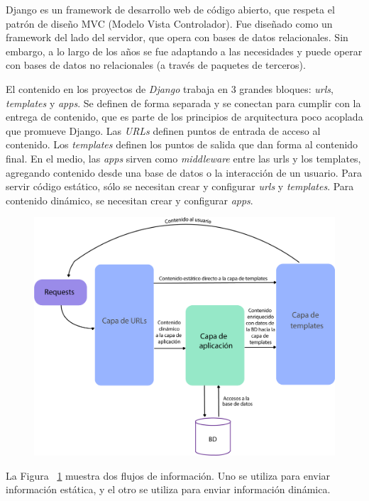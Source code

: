 Django es un framework de desarrollo web de código abierto, que respeta el patrón de diseño MVC (Modelo Vista Controlador). Fue diseñado como un framework del lado del servidor, que opera con bases de datos relacionales. Sin embargo, a lo largo de los años se fue adaptando a las necesidades y puede operar con bases de datos no relacionales (a través de paquetes de terceros).

El contenido en los proyectos de \textit{Django} trabaja en 3 grandes bloques: \textit{urls}, \textit{templates} y \textit{apps}. Se definen de forma separada y se conectan para cumplir con la entrega de contenido, que es parte de los principios de arquitectura poco acoplada que promueve Django.
Las \textit{URLs} definen puntos de entrada de acceso al contenido. Los \textit{templates} definen los puntos de salida que dan forma al contenido final. En el medio, las \textit{apps} sirven como \textit{middleware} entre las urls y los templates, agregando contenido desde una base de datos o la interacción de un usuario. 
Para servir código estático, sólo se necesitan crear y configurar \textit{urls} y \textit{templates}. Para contenido dinámico, se necesitan crear y configurar \textit{apps}.

\begin{figure}[h!]
  \centering
    \includegraphics[scale=0.9]{images/django.png}
  \label{fig:flujo_django}
\end{figure}

La Figura ~\ref{fig:flujo_django} muestra dos flujos de información. Uno se utiliza para enviar información estática, y el otro se utiliza para enviar información dinámica.

